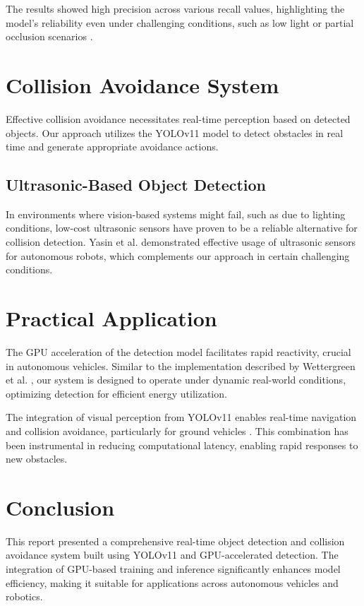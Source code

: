 \documentclass[12pt]{article}
\begin{document}
The results showed high precision across various recall values, highlighting the model's reliability even under challenging conditions, such as low light or partial occlusion scenarios \cite{eppenberger2020leveraging}.

\section{Collision Avoidance System}

Effective collision avoidance necessitates real-time perception based on detected objects. Our approach utilizes the YOLOv11 model to detect obstacles in real time and generate appropriate avoidance actions.

\subsection{Ultrasonic-Based Object Detection}
In environments where vision-based systems might fail, such as due to lighting conditions, low-cost ultrasonic sensors have proven to be a reliable alternative for collision detection. Yasin et al. \cite{yasin2020low} demonstrated effective usage of ultrasonic sensors for autonomous robots, which complements our approach in certain challenging conditions.

\section{Practical Application}
The GPU acceleration of the detection model facilitates rapid reactivity, crucial in autonomous vehicles. Similar to the implementation described by Wettergreen et al. \cite{wettergreen2005sun}, our system is designed to operate under dynamic real-world conditions, optimizing detection for efficient energy utilization.

The integration of visual perception from YOLOv11 enables real-time navigation and collision avoidance, particularly for ground vehicles \cite{whittaker2001robotic}. This combination has been instrumental in reducing computational latency, enabling rapid responses to new obstacles.

\section{Conclusion}

This report presented a comprehensive real-time object detection and collision avoidance system built using YOLOv11 and GPU-accelerated detection. The integration of GPU-based training and inference significantly enhances model efficiency, making it suitable for applications across autonomous vehicles and robotics.
\end{document}
